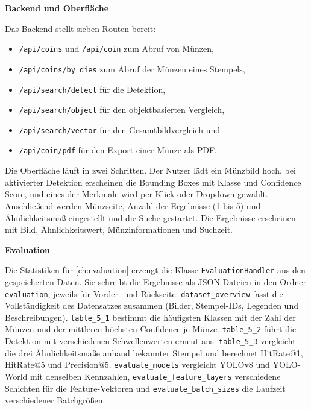 \vspace{\baselineskip}

\noindent \textbf{Backend und Oberfläche}

\noindent Das Backend stellt sieben Routen bereit:
\begin{itemize}
    \item \lstinline|/api/coins| und \lstinline|/api/coin| zum Abruf von Münzen,
    \item \lstinline|/api/coins/by_dies| zum Abruf der Münzen eines Stempels,
    \item \lstinline|/api/search/detect| für die Detektion,
    \item \lstinline|/api/search/object| für den objektbasierten Vergleich,
    \item \lstinline|/api/search/vector| für den Gesamtbildvergleich und
    \item \lstinline|/api/coin/pdf| für den Export einer Münze als PDF.
\end{itemize}
Die Oberfläche läuft in zwei Schritten. Der Nutzer lädt ein Münzbild hoch, bei aktivierter Detektion erscheinen die Bounding Boxes mit Klasse und Confidence Score, und eines der Merkmale wird per Klick oder Dropdown gewählt. Anschließend werden Münzseite, Anzahl der Ergebnisse (1 bis 5) und Ähnlichkeitsmaß eingestellt und die Suche gestartet. Die Ergebnisse erscheinen mit Bild, Ähnlichkeitswert, Münzinformationen und Suchzeit.

\vspace{\baselineskip}

\noindent \textbf{Evaluation}

\noindent Die Statistiken für \cref{ch:evaluation} erzeugt die Klasse \lstinline|EvaluationHandler| aus den gespeicherten Daten. Sie schreibt die Ergebnisse als JSON-Dateien in den Ordner \texttt{evaluation}, jeweils für Vorder- und Rückseite. \lstinline|dataset_overview| fasst die Vollständigkeit des Datensatzes zusammen (Bilder, Stempel-IDs, Legenden und Beschreibungen). \lstinline|table_5_1| bestimmt die häufigsten Klassen mit der Zahl der Münzen und der mittleren höchsten Confidence je Münze. \lstinline|table_5_2| führt die Detektion mit verschiedenen Schwellenwerten erneut aus. \lstinline|table_5_3| vergleicht die drei Ähnlichkeitsmaße anhand bekannter Stempel und berechnet HitRate@1, HitRate@5 und Precision@5. \lstinline|evaluate_models| vergleicht YOLOv8 und YOLO-World mit denselben Kennzahlen, \lstinline|evaluate_feature_layers| verschiedene Schichten für die Feature-Vektoren und \lstinline|evaluate_batch_sizes| die Laufzeit verschiedener Batchgrößen.

